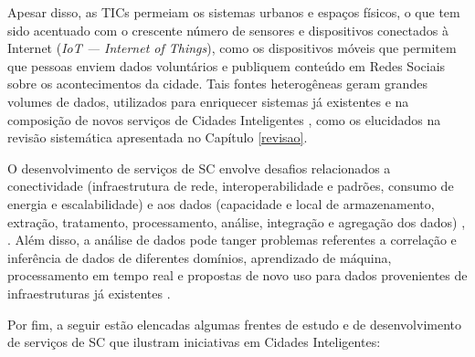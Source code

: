 \documentclass[
	12pt,				%
	oneside,			%
	a4paper,			%
	english,			%
	brazil				%
	]{abntex2ppgsi}
\begin{document}
{Apesar disso, as TICs permeiam os sistemas urbanos e espaços físicos, o que tem sido acentuado com o crescente número de sensores e dispositivos conectados à Internet (\textit{IoT --- Internet of Things}), como os dispositivos móveis que permitem que pessoas enviem dados voluntários e publiquem conteúdo em Redes Sociais sobre os acontecimentos da cidade. Tais fontes heterogêneas geram grandes volumes de dados, utilizados para enriquecer sistemas já existentes e na composição de novos serviços de Cidades Inteligentes \cite{Finger2017} \cite{Ang2017}, como os elucidados na revisão sistemática apresentada no Capítulo \ref{revisao}.

O desenvolvimento de serviços de SC envolve desafios relacionados a conectividade (infraestrutura de rede, interoperabilidade e padrões, consumo de energia e escalabilidade) e aos dados (capacidade e local de armazenamento, extração, tratamento, processamento, análise, integração e agregação dos dados) \cite{Ang2017}, \cite{Xiao2017}. Além disso, a análise de dados pode tanger problemas referentes a correlação e inferência de dados de diferentes domínios, aprendizado de máquina, processamento em tempo real e propostas de novo uso para dados provenientes de infraestruturas já existentes \cite{Ang2017}.

Por fim, a seguir estão elencadas algumas frentes de estudo e de desenvolvimento de serviços de SC que ilustram iniciativas em Cidades Inteligentes:

}
\end{document}
